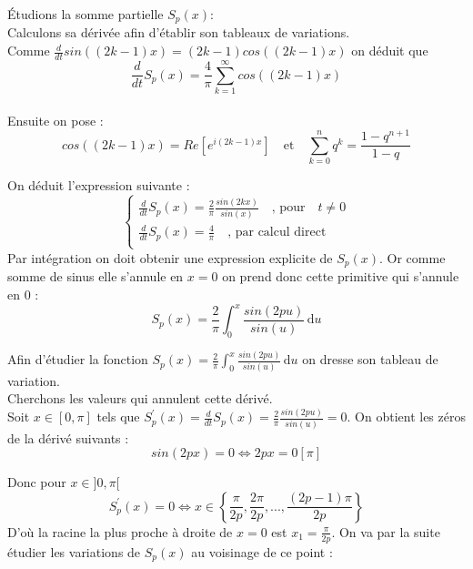 \documentclass[a4paper,12pt]{report}
\begin{document}
\'Etudions la somme partielle $S_{p}(x)$:\\
Calculons sa d\'eriv\'ee afin d'\'etablir son tableaux de variations. \\
Comme $\displaystyle\frac{d}{dt}sin((2k-1)x) = (2k-1)cos((2k-1)x)$ on d\'eduit que \\
$$\frac{d}{dt}S_{p}(x) = \frac{4}{\pi}\sum\limits_{k=1}^{\infty}cos((2k-1)x)$$\\

Ensuite on pose : \[cos((2k-1)x) = Re [e^{i(2k-1)x}] \quad \text{et} \quad \sum\limits_{k=0}^{n}q^{k} = \frac{1-q^{n+1}}{1-q}\]

On d\'eduit l'expression suivante :
\[ 
\left\{
  \begin{aligned}
  \frac{d}{dt}S_{p}(x)= \frac{2}{\pi}\frac{sin(2kx)}{sin(x)}\quad \text{, pour} \quad t \neq 0\\
  \frac{d}{dt}S_{p}(x)= \frac{4}{\pi} \quad \text{, par calcul direct}\\
  \end{aligned}
\right.\]
Par int\'egration on doit obtenir une expression explicite de $S_{p}(x)$. Or comme somme de sinus elle s'annule en $x=0$ on prend donc cette primitive qui s'annule en 0 :
$$S_{p}(x)= \frac{2}{\pi}\displaystyle\int_{0}^{x}\frac{sin(2pu)}{sin(u)} \, \mathrm{d}u$$

Afin d'\'etudier la fonction $S_{p}(x)= \frac{2}{\pi}\displaystyle\int_{0}^{x}\frac{sin(2pu)}{sin(u)} \, \mathrm{d}u$ on dresse son tableau de variation.\\
Cherchons les valeurs qui annulent cette d\'eriv\'e.\\
Soit $x \in [0,\pi]$ tels que $S_{p}^{'}(x) = \frac{d}{dt}S_{p}(x) = \frac{2}{\pi}\frac{sin(2pu)}{sin(u)} = 0$. On obtient les z\'eros de la d\'eriv\'e suivants : \[sin(2px)=0 \iff 2px = 0[\pi]\]

Donc pour $x \in ]0,\pi[$  \[S_{p}^{'}(x) = 0 \iff x \in \left\{\frac{\pi}{2p},\frac{2\pi}{2p},...,\frac{(2p-1)\pi}{2p}\right\}\]
D'o\`u la racine la plus proche \`a droite de $x = 0$ est $x_{1} = \frac{\pi}{2p}$. On va par la suite \'etudier les variations de $S_{p}(x)$ au voisinage de ce point :\\

\begin{center}
\end{center}
\end{document}
